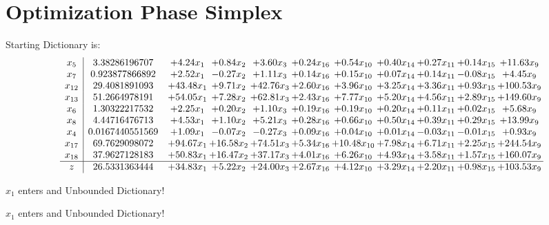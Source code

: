 \documentclass[9pt]{article}
\begin{document}
\section{Optimization Phase Simplex}
Starting Dictionary is:
\[\begin{array}{c| c c@{\hskip 2pt} c@{\hskip 2pt} c@{\hskip 2pt} c@{\hskip 2pt} c@{\hskip 2pt} c@{\hskip 2pt} c@{\hskip 2pt} c@{\hskip 2pt} c@{\hskip 2pt} }
 x_{5}   &  3.38286196707 & +  4.24 x_{1} & +  0.84 x_{2} & +  3.60 x_{3} & +  0.24 x_{16} & +  0.54 x_{10} & +  0.40 x_{14} & +  0.27 x_{11} & +  0.14 x_{15} & + 11.63 x_{9}\\
 x_{7}   &  0.923877866892 & +  2.52 x_{1} & -0.27 x_{2} & +  1.11 x_{3} & +  0.14 x_{16} & +  0.15 x_{10} & +  0.07 x_{14} & +  0.14 x_{11} & -0.08 x_{15} & +  4.45 x_{9}\\
 x_{12}   &  29.4081891093 & + 43.48 x_{1} & +  9.71 x_{2} & + 42.76 x_{3} & +  2.60 x_{16} & +  3.96 x_{10} & +  3.25 x_{14} & +  3.36 x_{11} & +  0.93 x_{15} & + 100.53 x_{9}\\
 x_{13}   &  51.2664978191 & + 54.05 x_{1} & +  7.28 x_{2} & + 62.81 x_{3} & +  2.43 x_{16} & +  7.77 x_{10} & +  5.20 x_{14} & +  4.56 x_{11} & +  2.89 x_{15} & + 149.60 x_{9}\\
 x_{6}   &  1.30322217532 & +  2.25 x_{1} & +  0.20 x_{2} & +  1.10 x_{3} & +  0.19 x_{16} & +  0.19 x_{10} & +  0.20 x_{14} & +  0.11 x_{11} & +  0.02 x_{15} & +  5.68 x_{9}\\
 x_{8}   &  4.44716476713 & +  4.53 x_{1} & +  1.10 x_{2} & +  5.21 x_{3} & +  0.28 x_{16} & +  0.66 x_{10} & +  0.50 x_{14} & +  0.39 x_{11} & +  0.29 x_{15} & + 13.99 x_{9}\\
 x_{4}   &  0.0167440551569 & +  1.09 x_{1} & -0.07 x_{2} & -0.27 x_{3} & +  0.09 x_{16} & +  0.04 x_{10} & +  0.01 x_{14} & -0.03 x_{11} & -0.01 x_{15} & +  0.93 x_{9}\\
 x_{17}   &  69.7629098072 & + 94.67 x_{1} & + 16.58 x_{2} & + 74.51 x_{3} & +  5.34 x_{16} & + 10.48 x_{10} & +  7.98 x_{14} & +  6.71 x_{11} & +  2.25 x_{15} & + 244.54 x_{9}\\
 x_{18}   &  37.9627128183 & + 50.83 x_{1} & + 16.47 x_{2} & + 37.17 x_{3} & +  4.01 x_{16} & +  6.26 x_{10} & +  4.93 x_{14} & +  3.58 x_{11} & +  1.57 x_{15} & + 160.07 x_{9}\\
\hline
z    &  26.5331363444 & + 34.83 x_{1} & +  5.22 x_{2} & + 24.00 x_{3} & +  2.67 x_{16} & +  4.12 x_{10} & +  3.29 x_{14} & +  2.20 x_{11} & +  0.98 x_{15} & + 103.53 x_{9}\\
\end{array}\]


 $ x_{1} $ enters and Unbounded Dictionary!


 $ x_{1} $ enters and Unbounded Dictionary!
\end{document}
